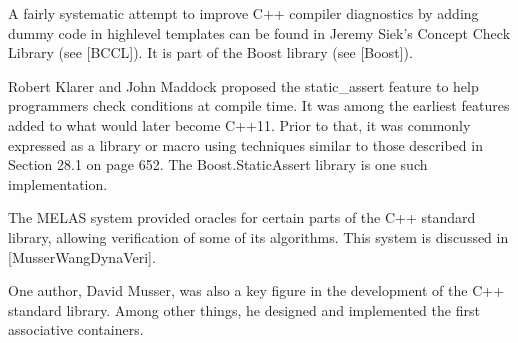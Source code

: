 A fairly systematic attempt to improve C++ compiler diagnostics by adding dummy code in highlevel templates can be found in Jeremy Siek’s Concept Check Library (see [BCCL]). It is part of  the Boost library (see [Boost]).

Robert Klarer and John Maddock proposed the static\_assert feature to help programmers check conditions at compile time. It was among the earliest features added to what would later become C++11. Prior to that, it was commonly expressed as a library or macro using techniques similar to those described in Section 28.1 on page 652. The Boost.StaticAssert library is one such implementation.

The MELAS system provided oracles for certain parts of the C++ standard library, allowing verification of some of its algorithms. This system is discussed in [MusserWangDynaVeri].

\begin{tcolorbox}[colback=webgreen!5!white,colframe=webgreen!75!black]
\hspace*{0.75cm}One author, David Musser, was also a key figure in the development of the C++ standard library. Among other things, he designed and implemented the first associative containers.
\end{tcolorbox}

